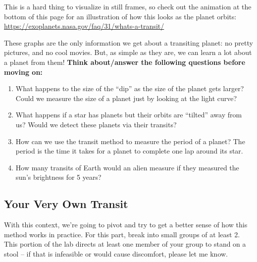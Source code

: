 \documentclass[11pt]{article}
\begin{document}
\medskip \noindent
This is a hard thing to visualize in still frames, so check out the animation at the bottom of this page for an illustration of how this looks as the planet orbits: \url{https://exoplanets.nasa.gov/faq/31/whats-a-transit/}

\medskip \noindent
These graphs are the only information we get about a transiting planet: no pretty pictures, and no cool movies. But, as simple as they are, we can learn a lot about a planet from them! \textbf{Think about/answer the following questions before moving on:}

\begin{enumerate}
    \item What happens to the size of the “dip” as the size of the planet gets larger? Could we measure the size of a planet just by looking at the light curve?
    
    \item What happens if a star has planets but their orbits are “tilted” away from us? Would we detect these planets via their transits?
    
    \item How can we use the transit method to measure the period of a planet? The period is the time it takes for a planet to complete one lap around its star.
    
    \item How many transits of Earth would an alien measure if they measured the sun’s brightness for 5 years?
\end{enumerate}

\subsection{Your Very Own Transit}
\noindent
With this context, we’re going to pivot and try to get a better sense of how this method works in practice. For this part, break into small groups of at least 2. This portion of the lab directs at least one member of your group to stand on a stool -- if that is infeasible or would cause discomfort, please let me know.
\end{document}
